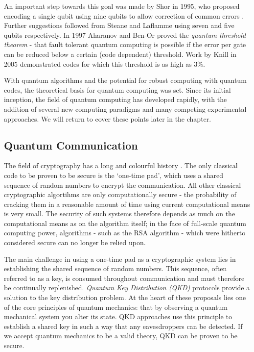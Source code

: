 An important step towards this goal was made by Shor in 1995, who proposed encoding a single qubit using nine qubits to allow correction of common errors \cite{shor_codes_95}. Further suggestions followed from Steane and Laflamme \cite{steane_code_96, steane_code_96_2, laflamme_5_code} using seven and five qubits respectively. In 1997 Aharanov and Ben-Or proved the \textit{quantum threshold theorem} \cite{quantum_threshold_theorem} - that fault tolerant quantum computing is possible if the error per gate can be reduced below a certain (code dependent) threshold. Work by Knill in 2005 \cite{knill_correction} demonstrated codes for which this threshold is as high as 3\%. 

With quantum algorithms and the potential for robust computing with quantum codes, the theoretical basis for quantum computing was set. Since its initial inception, the field of quantum computing has developed rapidly, with the addition of several new computing paradigms and many competing experimental approaches. We will return to cover these points later in the chapter.

\subsection{Quantum Communication}

The field of cryptography has a long and colourful history \cite{the_code_book}. The only classical code to be proven to be secure is the `one-time pad', which uses a shared sequence of random numbers to encrypt the communication. All other classical cryptographic algortihms are only computationally secure - the probability of cracking them in a reasonable amount of time using current computational means is very small. The security of such systems therefore depends as much on the computational means as on the algorithm itself; in the face of  full-scale quantum computing power, algorithms - such as the RSA algorithm - which were hitherto considered secure can no longer be relied upon.

The main challenge in using a one-time pad as a cryptographic system lies in establishing the shared sequence of random numbers. This sequence, often referred to as a key, is consumed throughout communication and must therefore be continually replenished. \textit{Quantum Key Distribution (QKD)} protocols provide a solution to the key distribution problem. At the heart of these proposals lies one of the core principles of quantum mechanics: that by observing a quantum mechanical system you alter its state. QKD approaches use this principle to establish a shared key in such a way that any eavesdroppers can be detected. If we accept quantum mechanics to be a valid theory, QKD can be proven to be secure.

